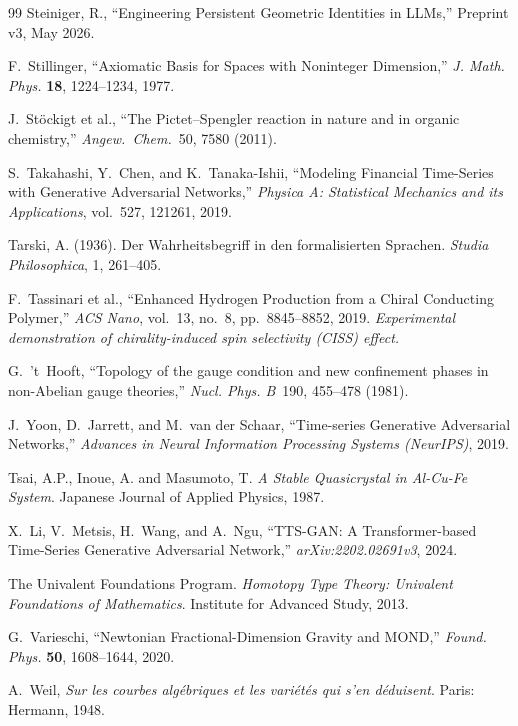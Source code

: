 \documentclass[12pt,oneside]{book}
\theoremstyle{principia}
\theoremstyle{definition}
\theoremstyle{remark}
\begin{document}
\begin{thebibliography}{99}
Steiniger, R.,
``Engineering Persistent Geometric Identities in LLMs,''
Preprint v3, May 2026.

F.~Stillinger, ``Axiomatic Basis for Spaces with Noninteger Dimension,'' \emph{J. Math. Phys.} \textbf{18}, 1224--1234, 1977.

J.~St\"ockigt et al., ``The Pictet--Spengler reaction in nature and in organic chemistry,'' \emph{Angew.~Chem.}\ 50, 7580 (2011).

S.~Takahashi, Y.~Chen, and K.~Tanaka-Ishii,
``Modeling Financial Time-Series with Generative Adversarial Networks,''
\emph{Physica A: Statistical Mechanics and its Applications}, vol.~527, 121261, 2019.

Tarski, A. (1936). Der Wahrheitsbegriff in den formalisierten Sprachen. \emph{Studia Philosophica}, 1, 261--405.

F.~Tassinari et al.,
``Enhanced Hydrogen Production from a Chiral Conducting Polymer,''
\emph{ACS Nano}, vol.~13, no.~8, pp.~8845--8852, 2019.
\textit{Experimental demonstration of chirality-induced spin selectivity (CISS) effect.}

G.~'t~Hooft,
``Topology of the gauge condition and new confinement phases in non-Abelian gauge theories,''
\emph{Nucl. Phys. B}\ 190, 455--478 (1981).

J.~Yoon, D.~Jarrett, and M.~van der Schaar,
``Time-series Generative Adversarial Networks,''
\emph{Advances in Neural Information Processing Systems (NeurIPS)}, 2019.

Tsai, A.P., Inoue, A. and Masumoto, T.
\newblock \emph{A Stable Quasicrystal in Al-Cu-Fe System}.
\newblock Japanese Journal of Applied Physics, 1987.

X.~Li, V.~Metsis, H.~Wang, and A.~Ngu,
``TTS-GAN: A Transformer-based Time-Series Generative Adversarial Network,''
\emph{arXiv:2202.02691v3}, 2024.

The Univalent Foundations Program.
\newblock \emph{Homotopy Type Theory: Univalent Foundations of Mathematics}.
\newblock Institute for Advanced Study, 2013.

G.~Varieschi, ``Newtonian Fractional-Dimension Gravity and MOND,'' \emph{Found. Phys.} \textbf{50}, 1608--1644, 2020.

A.~Weil,
\emph{Sur les courbes alg\'ebriques et les vari\'et\'es qui s'en d\'eduisent}.
Paris: Hermann, 1948.


\end{thebibliography}
\end{document}
